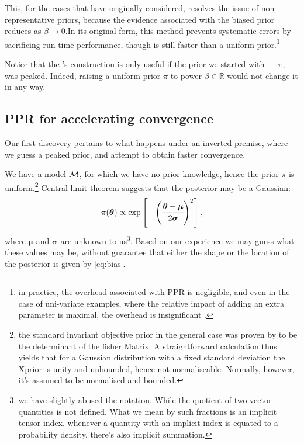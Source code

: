 \documentclass[usenatbib]{mnras}
\begin{document}
This, for the cases that \citeauthor{chen-ferroz-hobson} have
originally considered, resolves the issue of non-representative
priors, because the evidence associated with the biased prior
reduces as \(\beta\rightarrow0\).In its original form, this method
prevents systematic errors by sacrificing run-time performance,
though is still faster than a uniform prior.\footnote{in practice, the
overhead associated with PPR is negligible, and even in the case of
uni-variate examples, where the relative impact of adding an extra
parameter is maximal, the overhead is insignificant
\cite[see numerical examples]{chen-ferroz-hobson}.}

Notice that the \citeauthor{chen-ferroz-hobson} 's construction is
only useful if the prior we started with --- \(\pi\), was
peaked. Indeed, raising a uniform prior \(\pi\) to power \(\beta \in
   \mathbb{R}\) would not change it in any way.

\subsection{PPR for  accelerating convergence}
\label{sec:org1c4b3f9}

Our first discovery pertains to what happens under an inverted
premise, where we guess a peaked prior, and attempt to obtain
faster convergence. 

We have a model \({\cal M}\), for which we have no prior knowledge,
hence the prior \(\pi\) is uniform.\footnote{the standard invariant
objective prior in the general case was proven by
\cite{JeffreysPrior} to be the determinant of the fisher Matrix. A
straightforward calculation thus yields that for a Gaussian
distribution with a fixed standard deviation the Xprior is unity and
unbounded, hence not normaliseable. Normally, however, it's assumed
to be normalised and bounded.} Central limit theorem suggests that
the posterior may be a Gaussian:
\begin{equation}
 \pi (\bm{\theta}) \propto \exp \left[-\left(\cfrac{\bm{\theta} - \bm{\mu}}{2\bm{\sigma}}\right)^{2} \right],
 \label{eq:bias}
\end{equation}
where \(\bm{\mu}\) and \(\bm{\sigma}\) are unknown to us\footnote{we
have slightly abused the notation. While the quotient of two vector
quantities is not defined. What we mean by such fractions is an
implicit tensor index. whenever a quantity with an implicit index
is equated to a probability density, there's also implicit summation.}. Based on
our experience we may guess what these values may be, without
guarantee that either the shape or the location of the posterior is
given by \autoref{eq:bias}.
\end{document}
